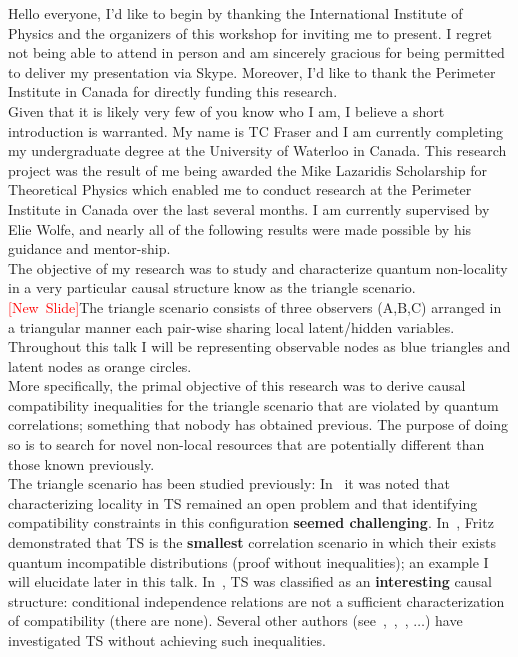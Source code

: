 \documentclass{article}
\newcommand{\newslide}{\textcolor{red}{[New~Slide]}}
\begin{document}
    Hello everyone, I'd like to begin by thanking the International Institute of Physics and the organizers of this workshop for inviting me to present.
    I regret not being able to attend in person and am sincerely gracious for being permitted to deliver my presentation via Skype.
    Moreover, I'd like to thank the Perimeter Institute in Canada for directly funding this research. \\

    Given that it is likely very few of you know who I am, I believe a short introduction is warranted. My name is TC Fraser and I am currently completing my undergraduate degree at the University of Waterloo in Canada. This research project was the result of me being awarded the Mike Lazaridis Scholarship for Theoretical Physics which enabled me to conduct research at the Perimeter Institute in Canada over the last several months. I am currently supervised by Elie Wolfe, and nearly all of the following results were made possible by his guidance and mentor-ship. \\

    The objective of my research was to study and characterize quantum non-locality in a very particular causal structure know as the triangle scenario. \newslide The triangle scenario consists of three observers (A,B,C) arranged in a triangular manner each pair-wise sharing local latent/hidden variables. Throughout this talk I will be representing observable nodes as blue triangles and latent nodes as orange circles. \\

    More specifically, the primal objective of this research was to derive causal compatibility inequalities for the triangle scenario that are violated by quantum correlations; something that nobody has obtained previous. The purpose of doing so is to search for novel non-local resources that are potentially different than those known previously. \\

    The triangle scenario has been studied previously:
    In~\cite{Branciard_2012} it was noted that characterizing locality in TS remained an open problem and that identifying compatibility constraints in this configuration \textbf{seemed challenging}.
    {In~\cite{Fritz_2012}, Fritz demonstrated that TS is the \textbf{smallest} correlation scenario in which their exists quantum incompatible distributions (proof without inequalities)}; an example I will elucidate later in this talk.
    {In~\cite{Henson_2014}, TS was classified as an \textbf{interesting} causal structure: conditional independence relations are not a sufficient characterization of compatibility (there are none)}.
    {Several other authors (see~\cite{Steudel_2010},~\cite{Chaves_2014},~\cite{Inflation}, $\ldots$) have investigated TS without achieving such inequalities.}
\end{document}
